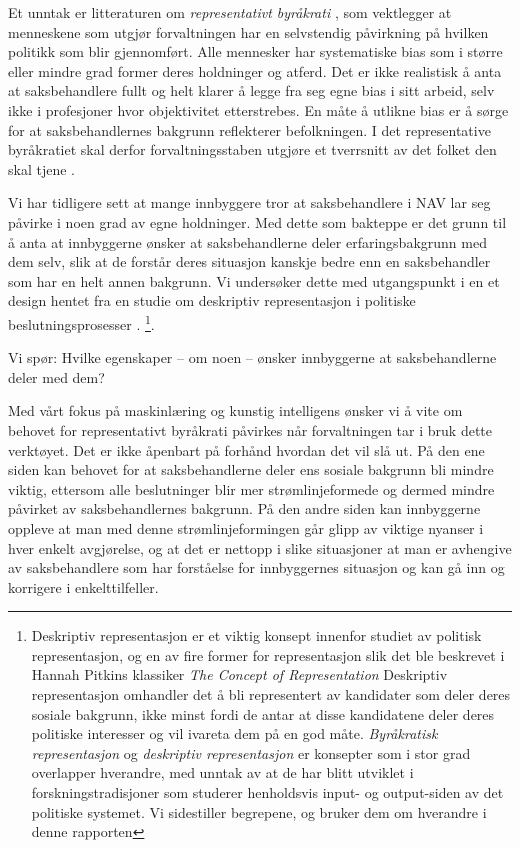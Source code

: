 \documentclass[
  12pt,
  a4paper, 12pt]{article}
\begin{document}
Et unntak er litteraturen om \emph{representativt byråkrati} \citep{krislov2012representative, lim2006representative}, som vektlegger at menneskene som utgjør forvaltningen har en selvstendig påvirkning på hvilken politikk som blir gjennomført.
Alle mennesker har systematiske bias som i større eller mindre grad former deres holdninger og atferd.
Det er ikke realistisk å anta at saksbehandlere fullt og helt klarer å legge fra seg egne bias i sitt arbeid, selv ikke i profesjoner hvor objektivitet etterstrebes.
En måte å utlikne bias er å sørge for at saksbehandlernes bakgrunn reflekterer befolkningen.
I det representative byråkratiet skal derfor forvaltningsstaben utgjøre et tverrsnitt av det folket den skal tjene \citep{laegreid1978byraakrati, christensen2001profesjoner}.

Vi har tidligere sett at mange innbyggere tror at saksbehandlere i NAV lar seg påvirke i noen grad av egne holdninger.
Med dette som bakteppe er det grunn til å anta at innbyggerne ønsker at saksbehandlerne deler erfaringsbakgrunn med dem selv, slik at de forstår deres situasjon kanskje bedre enn en saksbehandler som har en helt annen bakgrunn.
Vi undersøker dette med utgangspunkt i en et design hentet fra en studie om deskriptiv representasjon i politiske beslutningsprosesser \citep{arnesen2018legitimacy}. \footnote{Deskriptiv representasjon er et viktig konsept innenfor studiet av politisk representasjon, og en av fire former for representasjon slik det ble beskrevet i Hannah Pitkins klassiker \emph{The Concept of Representation} \citeyearpar{pitkin1967concept}
  Deskriptiv representasjon omhandler det å bli representert av kandidater som deler deres sosiale bakgrunn, ikke minst fordi de antar at disse kandidatene deler deres politiske interesser og vil ivareta dem på en god måte.
  \emph{Byråkratisk representasjon} og \emph{deskriptiv representasjon} er konsepter som i stor grad overlapper hverandre, med unntak av at de har blitt utviklet i forskningstradisjoner som studerer henholdsvis input- og output-siden av det politiske systemet.
  Vi sidestiller begrepene, og bruker dem om hverandre i denne rapporten}.

Vi spør:
Hvilke egenskaper -- om noen -- ønsker innbyggerne at saksbehandlerne deler med dem?

Med vårt fokus på maskinlæring og kunstig intelligens ønsker vi å vite om behovet for representativt byråkrati påvirkes når forvaltningen tar i bruk dette verktøyet.
Det er ikke åpenbart på forhånd hvordan det vil slå ut.
På den ene siden kan behovet for at saksbehandlerne deler ens sosiale bakgrunn bli mindre viktig, ettersom alle beslutninger blir mer strømlinjeformede og dermed mindre påvirket av saksbehandlernes bakgrunn.
På den andre siden kan innbyggerne oppleve at man med denne strømlinjeformingen går glipp av viktige nyanser i hver enkelt avgjørelse, og at det er nettopp i slike situasjoner at man er avhengive av saksbehandlere som har forståelse for innbyggernes situasjon og kan gå inn og korrigere i enkelttilfeller.
\end{document}
